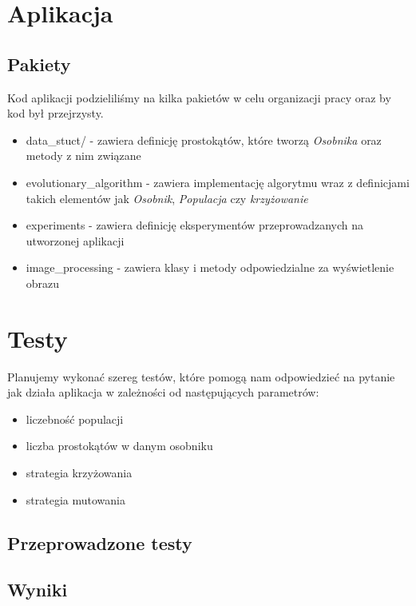 \documentclass{article}
\begin{document}
\section{Aplikacja}
\subsection{Pakiety}
Kod aplikacji podzieliliśmy na kilka pakietów w celu organizacji pracy oraz by kod był przejrzysty.
\begin{itemize}
    \item data_stuct/ - zawiera definicję prostokątów, które tworzą {\it Osobnika} oraz metody z nim związane
    \item evolutionary_algorithm - zawiera implementację algorytmu wraz z definicjami takich elementów jak {\it Osobnik}, {\it Populacja} czy {\it krzyżowanie}
    \item experiments - zawiera definicję eksperymentów przeprowadzanych na utworzonej aplikacji
    \item image_processing - zawiera klasy i metody odpowiedzialne za wyświetlenie obrazu
\end{itemize}
\section{Testy}
Planujemy wykonać szereg testów, które pomogą nam odpowiedzieć na pytanie jak działa aplikacja w zależności od następujących parametrów:
\begin{itemize}
    \item liczebność populacji
    \item liczba prostokątów w danym osobniku
    \item strategia krzyżowania
    \item strategia mutowania
\end{itemize}
\subsection{Przeprowadzone testy}
\subsection{Wyniki}
\end{document}
